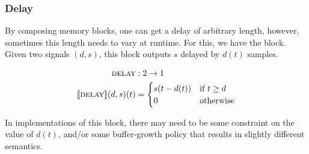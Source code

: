 \subsubsection{Delay}

By composing memory blocks, one can get a delay of arbitrary length, however, sometimes this length needs to
vary at runtime. For this, we have the \Delay block. Given two signals $(d, s)$, this block
outputs $s$ delayed by $d(t)$ samples.

\begin{align*}
  \textsc{delay}                 & : 2 \rightarrow 1            \\
  \llbracket \textsc{delay} \rrbracket(d, s)(t) & = \begin{cases}
    s(t - d(t)) & \text{if } t \geq d \\
    0           & \text{otherwise}
  \end{cases}
\end{align*}

In implementations of this block, there may need to be some constraint on the value of
$d(t)$, and/or some buffer-growth policy that results in slightly different semantics.
